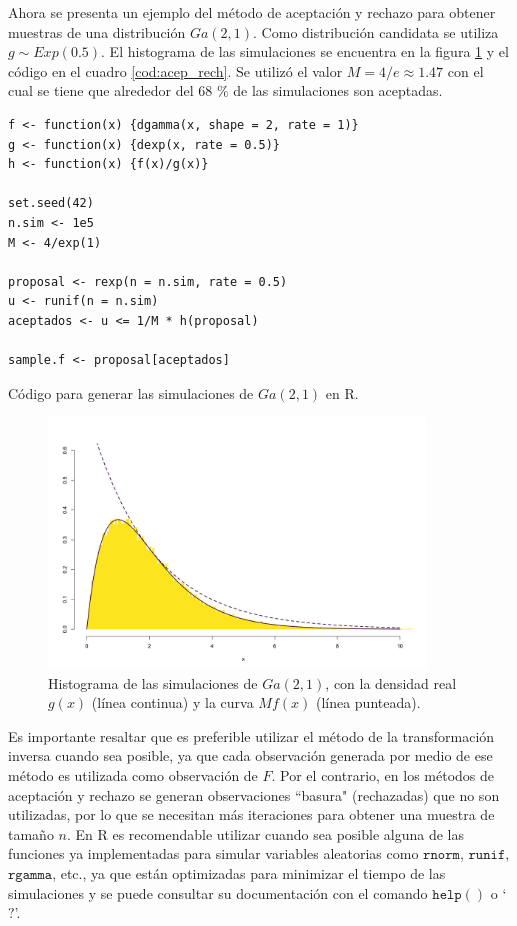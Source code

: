 \documentclass[11pt,a4paper]{article}
\begin{document}
Ahora se presenta un ejemplo del método de aceptación y rechazo para obtener muestras de una distribución $Ga(2, 1)$. Como distribución candidata se utiliza $g \sim Exp(0.5).$ El histograma de las simulaciones se encuentra en la figura \ref{fig:acep_rech} y el código en el cuadro \ref{cod:acep_rech}. Se utilizó el valor $M = 4/e \approx 1.47$ con el cual se tiene que alrededor del 68 \% de las simulaciones son aceptadas.

\begin{table}[!htb]
\begin{lstlisting}
f <- function(x) {dgamma(x, shape = 2, rate = 1)}
g <- function(x) {dexp(x, rate = 0.5)}
h <- function(x) {f(x)/g(x)}

set.seed(42)
n.sim <- 1e5
M <- 4/exp(1)

proposal <- rexp(n = n.sim, rate = 0.5)
u <- runif(n = n.sim)
aceptados <- u <= 1/M * h(proposal)

sample.f <- proposal[aceptados]
\end{lstlisting}
\caption{Código para generar las simulaciones de $Ga(2, 1)$ en R. }
\label{cod:acep_rech}
\end{table}

\begin{figure}[!htb]
\centering\includegraphics[width=10cm]{aceptacion_rechazo.png}
\caption{Histograma de las simulaciones de $Ga(2, 1)$, con la densidad real $g(x)$ (línea continua) y la curva $M f(x)$ (línea punteada).}
\label{fig:acep_rech}
\end{figure}

\newpage

Es importante resaltar que es preferible utilizar el método de la transformación inversa cuando sea posible, ya que cada observación generada por medio de ese método es utilizada como observación de $F$. Por el contrario, en los métodos de aceptación y rechazo se generan observaciones ``basura" (rechazadas) que no son utilizadas, por lo que se necesitan más iteraciones para obtener una muestra de tamaño $n$. En R es recomendable utilizar cuando sea posible alguna de las funciones ya implementadas para simular variables aleatorias como $\mathtt{rnorm}$, $\mathtt{runif}$, $\mathtt{rgamma}$, etc., ya que están optimizadas para minimizar el tiempo de las simulaciones y se puede consultar su documentación con el comando $\mathtt{help()}$ o `$\mathtt{?}$'.
\end{document}
